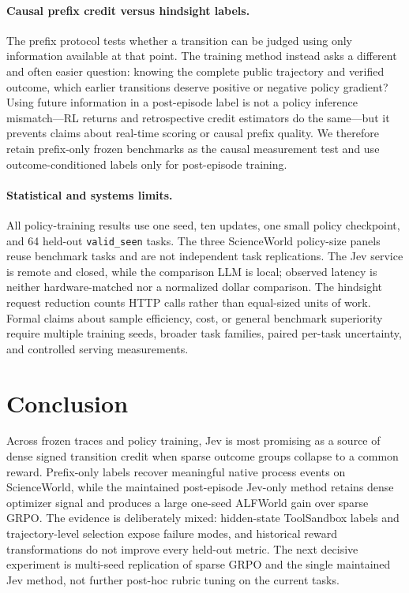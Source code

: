 \documentclass{article}
\begin{document}
\paragraph{Causal prefix credit versus hindsight labels.}
The prefix protocol tests whether a transition can be judged using only information available at that point. The training method instead asks a different and often easier question: knowing the complete public trajectory and verified outcome, which earlier transitions deserve positive or negative policy gradient? Using future information in a post-episode label is not a policy inference mismatch---RL returns and retrospective credit estimators do the same---but it prevents claims about real-time scoring or causal prefix quality. We therefore retain prefix-only frozen benchmarks as the causal measurement test and use outcome-conditioned labels only for post-episode training.

\paragraph{Statistical and systems limits.}
All policy-training results use one seed, ten updates, one small policy checkpoint, and 64 held-out \texttt{valid\_seen} tasks. The three ScienceWorld policy-size panels reuse benchmark tasks and are not independent task replications. The Jev service is remote and closed, while the comparison LLM is local; observed latency is neither hardware-matched nor a normalized dollar comparison. The hindsight request reduction counts HTTP calls rather than equal-sized units of work. Formal claims about sample efficiency, cost, or general benchmark superiority require multiple training seeds, broader task families, paired per-task uncertainty, and controlled serving measurements.

\section{Conclusion}

Across frozen traces and policy training, Jev is most promising as a source of dense signed transition credit when sparse outcome groups collapse to a common reward. Prefix-only labels recover meaningful native process events on ScienceWorld, while the maintained post-episode Jev-only method retains dense optimizer signal and produces a large one-seed ALFWorld gain over sparse GRPO. The evidence is deliberately mixed: hidden-state ToolSandbox labels and trajectory-level selection expose failure modes, and historical reward transformations do not improve every held-out metric. The next decisive experiment is multi-seed replication of sparse GRPO and the single maintained Jev method, not further post-hoc rubric tuning on the current tasks.



\end{document}
